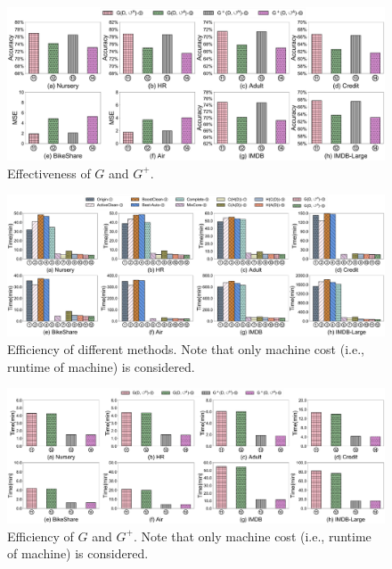 \begin{figure}
	\centering
	\includegraphics[width=\textwidth]{figs/effectiveness_new.pdf}
	\caption{Effectiveness of $G$ and $G^+$.}
	\label{fig:effectiveness_new}
\end{figure}


\begin{figure}
	\centering
	\includegraphics[width=\textwidth]{figs/efficiency_old.pdf}
	\caption{Efficiency of different methods. Note that only machine cost (i.e., runtime of machine) is considered.}
	\label{fig:efficiency_old}
\end{figure}

\begin{figure}
	\centering
	\includegraphics[width=\textwidth]{figs/efficiency_new.pdf}
	\caption{Efficiency of $G$ and $G^+$. Note that only machine cost (i.e., runtime of machine) is considered.}
	\label{fig:efficiency_new}
\end{figure}



